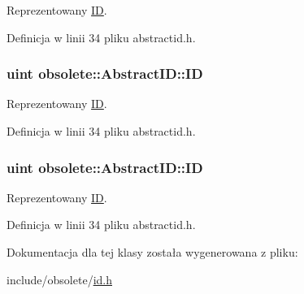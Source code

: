 Reprezentowany \hyperlink{classobsolete_1_1ID}{ID}. 



Definicja w linii 34 pliku abstractid.h.

\hypertarget{classobsolete_1_1AbstractID_a5f67fa1c7d96085f0ef41193b60b570c}{
\subsubsection[{ID}]{\setlength{\rightskip}{0pt plus 5cm}uint {\bf obsolete::AbstractID::ID}}}
\label{classobsolete_1_1AbstractID_a5f67fa1c7d96085f0ef41193b60b570c}


Reprezentowany \hyperlink{classobsolete_1_1ID}{ID}. 



Definicja w linii 34 pliku abstractid.h.

\hypertarget{classobsolete_1_1AbstractID_a5f67fa1c7d96085f0ef41193b60b570c}{
\subsubsection[{ID}]{\setlength{\rightskip}{0pt plus 5cm}uint {\bf obsolete::AbstractID::ID}}}
\label{classobsolete_1_1AbstractID_a5f67fa1c7d96085f0ef41193b60b570c}


Reprezentowany \hyperlink{classobsolete_1_1ID}{ID}. 



Definicja w linii 34 pliku abstractid.h.



Dokumentacja dla tej klasy została wygenerowana z pliku:\begin{DoxyCompactItemize}
\item 
include/obsolete/\hyperlink{id_8h}{id.h}\end{DoxyCompactItemize}
